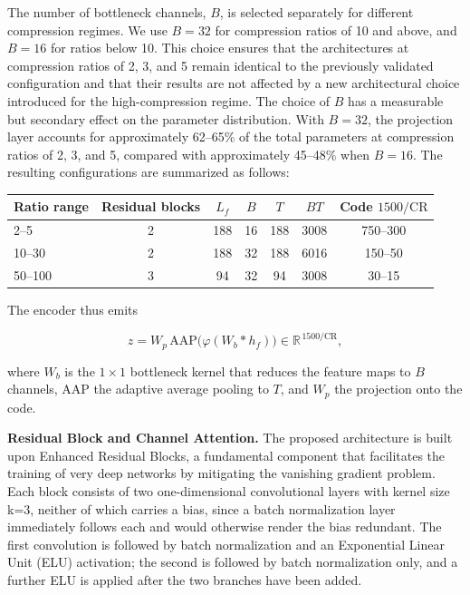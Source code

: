 \documentclass[fleqn,10pt]{wlscirep}
\begin{document}
The number of bottleneck channels, $B$, is selected separately for different compression regimes. We use $B=32$ for compression ratios of 10 and above, and $B=16$ for ratios below 10.  This choice ensures that the architectures at compression ratios of 2, 3, and 5 remain identical to the previously validated configuration and that their results are not affected by a new architectural choice introduced for the high-compression regime. The choice of $B$ has a measurable but secondary effect on the parameter distribution. With $B=32$, the projection layer accounts for approximately 62--65\% of the total parameters at compression ratios of 2, 3, and 5, compared with approximately 45--48\% when $B=16$. The resulting configurations are summarized as follows:

\begin{center}
\begin{tabular}{lcccccc}
\toprule
Ratio range & Residual blocks & $L_{f}$ & $B$ & $T$ & $BT$ & Code $1500/\mathrm{CR}$ \\
\midrule
2--5     & 2 & 188 & 16 & 188 & 3008 & 750--300 \\
10--30   & 2 & 188 & 32 & 188 & 6016 & 150--50  \\
50--100  & 3 & 94  & 32 & 94  & 3008 & 30--15   \\
\bottomrule
\end{tabular}
\end{center}

The encoder thus emits

\begin{equation}
z = W_{p}\,\mathrm{AAP}\big(\varphi(W_{b} \ast h_{f})\big) \in \mathbb{R}^{\,1500/\mathrm{CR}},
\end{equation}

where $W_{b}$ is the $1\times1$ bottleneck kernel that reduces the feature maps to $B$ channels, $\mathrm{AAP}$ the adaptive average pooling to $T$, and $W_{p}$ the projection onto the code.

\textbf{Residual Block and Channel Attention.} The proposed architecture is built upon Enhanced Residual Blocks, a fundamental component that facilitates the training of very deep networks by mitigating the vanishing gradient problem. Each block consists of two one-dimensional convolutional layers with kernel size k=3, neither of which carries a bias, since a batch normalization layer immediately follows each and would otherwise render the bias redundant. The first convolution is followed by batch normalization and an Exponential Linear Unit (ELU) activation; the second is followed by batch normalization only, and a further ELU is applied after the two branches have been added.
\end{document}

